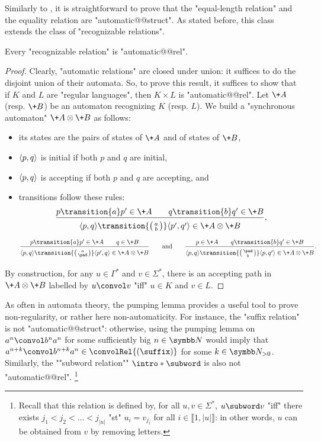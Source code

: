 Similarly to ,
it is straightforward to prove that the "equal-length relation"
and the equality relation are "automatic@@struct". As stated before, this class extends
the class of "recognizable relations".

\begin{proposition}
	\label{prop:rec-implies-aut}
	Every "recognizable relation" is "automatic@@rel".
\end{proposition}

\begin{proof}
	Clearly, "automatic relations" are closed under union: it suffices to do the disjoint union
	of their automata.
	So, to prove this result, it suffices to show that if $K$ and $L$ are "regular languages",
	then $K \times L$ is "automatic@@rel".
	Let $\+A$ (resp. $\+B$) be an automaton recognizing $K$ (resp. $L$). 
	We build a "synchronous automaton" $\+A \otimes \+B$ as follows:
	\begin{itemize}
		\item its states are the pairs of states of $\+A$ and of states of $\+B$,
		\item $\langle p,q\rangle$ is initial if both $p$ and $q$ are initial,
		\item $\langle p,q\rangle$ is accepting if both $p$ and $q$ are accepting, and
		\item transitions follow these rules:
		\[\frac{
			p \transition{a} p' \in \+A \qquad q \transition{b} q' \in \+B
		}{
			\vphantom{\Big()}
			\tup{p,q} \transition{\pair{a}{b}} \tup{p',q'}
				\in \+A \otimes \+B
		},\]
		\vspace{-1em}
		\[\frac{
			p \transition{a} p' \in \+A \qquad q \in \+B
		}{
			\vphantom{\Big()}
			\tup{p,q} \transition{\pair{a}{\pad}} \tup{p',q}
				\in \+A \otimes \+B
		}
		\qquad\text{and}\qquad
		\frac{
			p \in \+A \qquad q \transition{b} q' \in \+B
		}{
			\vphantom{\Big()}
			\tup{p,q} \transition{\pair{\pad}{b}} \tup{p,q'}
				\in \+A \otimes \+B
		}.
		\]
	\end{itemize}
	By construction, for any $u\in \Gamma^*$ and $v\in \Sigma^*$,
	there is an accepting path in $\+A \otimes \+B$ labelled by $u \convol v$ 
	"iff" $u \in K$ and $v\in L$.
\end{proof}

As often in automata theory, the pumping lemma provides a useful tool to prove
non-regularity, or rather here non-automaticity.
For instance, the "suffix relation" is not "automatic@@struct": otherwise,
using the pumping lemma on $a^n \convol b^n a^n$ for some sufficiently big $n\in\N$
would imply that $a^{n+k} \convol b^{n+k} a^n \in \convolRel{(\suffix)}$ for some $k\in\Np$.
Similarly, the \AP""subword relation"" $\intro*\subword$ is also not "automatic@@rel".%
\footnote{Recall that this relation is defined by, for all $u, v \in \Sigma^*$,
$u \subword v$ "iff" there exists $j_1 < j_2 < \hdots < j_{|u|}$ "st" $u_i = v_{j_{i}}$
for all $i \in \lBrack 1, |u|\rBrack$: in other words, $u$ can be obtained from $v$ by removing letters.}

